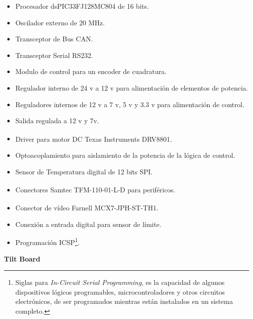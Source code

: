 \begin{itemize}
    \item Procesador dsPIC33FJ128MC804 de 16 bits.
    \item Oscilador externo de 20 MHz.
    \item Transceptor de Bus CAN.
    \item Transceptor Serial RS232.
    \item Modulo de control para un encoder de cuadratura.
    \item Regulador interno de 24 v a 12 v para alimentaci\'{o}n de elementos de potencia.
    \item Reguladores internos de 12 v a 7 v, 5 v y 3.3 v para alimentaci\'{o}n de control.
    \item Salida regulada a 12 v y 7v.
    \item Driver para motor DC Texas Instruments\textsuperscript{\textregistered} DRV8801.
    \item Optoacoplamiento para aislamiento de la potencia de la l\'{o}gica de control.
    \item Sensor de Temperatura digital de 12 bits SPI.
    \item Conectores Samtec\textsuperscript{\textregistered} TFM-110-01-L-D para perif\'{e}ricos.
    \item Conector de v\'{i}deo Farnell\textsuperscript{\textregistered} MCX7-JPH-ST-TH1.
    \item Conexi\'{o}n a entrada digital para sensor de l\'{i}mite. 
    \item Programaci\'{o}n ICSP\footnote{Siglas para \textit{In-Circuit Serial Programming}, es la capacidad de algunos dispositivos l\'{o}gicos programables, microcontroladores y otros circuitos electr\'{o}nicos, de ser programados mientras est\'{a}n instalados en un sistema completo.}. 
\end{itemize}

\begin{large}
\textbf{Tilt Board} 
\end{large}

